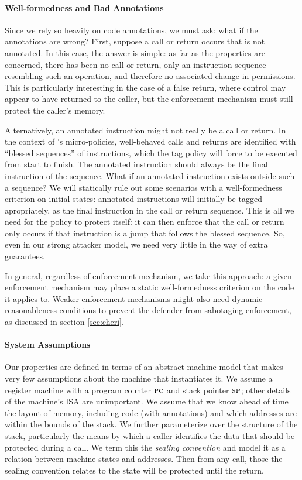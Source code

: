 \documentclass[acmsmall,review,anonymous]{acmart}\settopmatter{printfolios=true,printccs=false,printacmref=false}
\begin{document}
\paragraph*{Well-formedness and Bad Annotations}

Since we rely so heavily on code annotations, we must ask: what if the annotations
are wrong? First, suppose a call or return occurs that is not annotated.
In this case, the answer is simple: as far as the properties are concerned, there has
been no call or return, only an instruction sequence resembling such an operation, and
therefore no associated change in permissions. This is particularly interesting in the
case of a false return, where control may appear to have returned to the caller, but
the enforcement mechanism must still protect the caller's memory.

Alternatively, an annotated instruction might not really be a call or return.
In the context of \citeauthor{DBLP:conf/sp/RoesslerD18}'s micro-policies, well-behaved calls
and returns are identified with ``blessed sequences'' of instructions, which the tag policy
will force to be executed from start to finish. The annotated instruction should always
be the final instruction of the sequence. What if an annotated instruction exists outside
such a sequence? We will statically rule out some scenarios with a well-formedness criterion
on initial states: annotated instructions will initially be tagged apropriately, as the
final instruction in the call or return sequence. This is all we need for the policy to
protect itself: it can then enforce that the call or return only occurs if that instruction
is a jump that follows the blessed sequence. So, even in our strong attacker model, we need
very little in the way of extra guarantees.

In general, regardless of enforcement mechanism, we take this approach: 
a given enforcement mechanism may place a static well-formedness criterion
on the code it applies to. Weaker enforcement mechanisms might also need dynamic
reasonableness conditions to prevent the defender from sabotaging enforcement, as
discussed in section \ref{sec:cheri}.

\paragraph*{System Assumptions}

Our properties are defined in terms of an abstract machine model that makes very few
assumptions about the machine that instantiates it.  We assume a register
machine with a program counter \(\textsc{pc}\) and stack pointer \(\textsc{sp}\); other
details of the machine's ISA are unimportant. We assume that we know ahead of time
the layout of memory, including code (with annotations) and which addresses are within
the bounds of the stack.
%
We further parameterize over the structure of the stack, particularly the means by
which a caller identifies the data that should be protected during a call. We term
this the {\em sealing convention} and model it as a relation between machine states
and addresses. Then from any call, those the sealing convention relates to the
state will be protected until the return.
\end{document}
